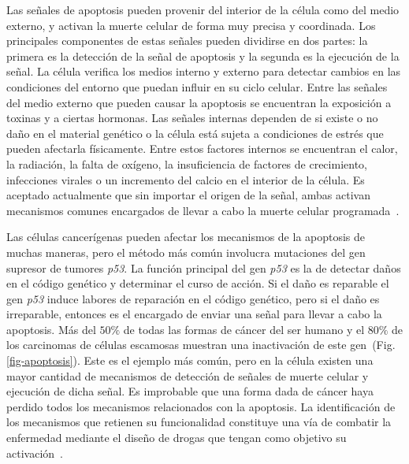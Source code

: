 Las se\~nales de apoptosis pueden provenir del interior de la c\'elula como del medio externo, y activan la muerte celular de forma muy precisa y coordinada. Los principales componentes de estas se\~nales pueden dividirse en dos partes: la primera es la detecci\'on de la se\~nal de apoptosis y la segunda es la ejecuci\'on de la se\~nal. La c\'elula verifica los medios interno y externo para detectar cambios en las condiciones del entorno que puedan influir en su ciclo celular. Entre las se\~nales del medio externo que pueden causar la apoptosis se encuentran la exposici\'on a toxinas y a ciertas hormonas. Las se\~nales internas dependen de si existe o no da\~no en el material gen\'etico o la c\'elula est\'a sujeta a condiciones de estr\'es que pueden afectarla f\'isicamente. Entre estos factores internos se encuentran el calor, la radiaci\'on, la falta de ox\'igeno, la insuficiencia de factores de crecimiento, infecciones virales o un incremento del calcio en el interior de la c\'elula. Es aceptado actualmente que sin importar el origen de la se\~nal, ambas activan mecanismos comunes encargados de llevar a cabo la muerte celular programada~\cite{robins,hanahan,cancerbook}.

Las c\'elulas cancer\'igenas pueden afectar los mecanismos de la apoptosis de muchas maneras, pero el m\'etodo m\'as com\'un involucra mutaciones del gen supresor de tumores \textit{p53}. La funci\'on principal del gen \textit{p53} es la de detectar da\~nos en el c\'odigo gen\'etico y determinar el curso de acci\'on. Si el da\~no es reparable el gen \textit{p53} induce labores de reparaci\'on en el c\'odigo gen\'etico, pero si el da\~no es irreparable, entonces es el encargado de enviar una se\~nal para llevar a cabo la apoptosis. M\'as del $50\%$ de todas las formas de c\'ancer del ser humano y el $80\%$ de los carcinomas de c\'elulas escamosas muestran una inactivaci\'on de este gen~(Fig.\ref{fig-apoptosis}). Este es el ejemplo m\'as com\'un, pero en la c\'elula existen una mayor cantidad de mecanismos de detecci\'on de se\~nales de muerte celular y ejecuci\'on de dicha se\~nal. Es improbable que una forma dada de c\'ancer haya perdido todos los mecanismos relacionados con la apoptosis. La identificaci\'on de los mecanismos que retienen su funcionalidad constituye una v\'ia de combatir la enfermedad mediante el dise\~no de drogas que tengan como objetivo su activaci\'on~\cite{robins,hanahan,cancerbook}.

